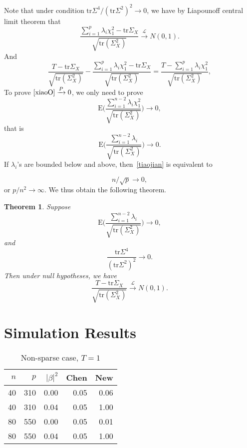 \documentclass[review]{elsarticle}
\theoremstyle{plain}
\newtheorem{theorem}{\quad\quad Theorem}
\theoremstyle{definition}
\theoremstyle{remark}
\begin{document}
Note that under condition \({\textrm{tr}\Sigma^4}/{{(\textrm{tr}\Sigma^2)}^2} \to 0\), we have by Liapounoff central limit theorem that
\[
    \frac{\sum_{i=1}^p \lambda_i \chi^2_1-\textrm{tr}\Sigma_X}{
        \sqrt{\textrm{tr}(\Sigma_X^2)}
    }\xrightarrow{\mathcal{L}}N(0,1).
    \]
And 
    \begin{equation}\label{xiaoO}
    \frac{T-\textrm{tr}\Sigma_X}{\sqrt{\textrm{tr}(\Sigma_X^2)}}-
    \frac{\sum_{i=1}^p \lambda_i \chi^2_1-\textrm{tr}\Sigma_X}{\sqrt{\textrm{tr}(\Sigma_X^2)}}
    =\frac{T-\sum_{i=1}^p \lambda_i \chi^2_1}{\sqrt{\textrm{tr}(\Sigma_X^2)}},
    \end{equation}
    To prove $\eqref{xiaoO}\xrightarrow{P}0$, we only need to prove
\[
    \textrm{E}\Big(\frac{\sum_{i=1}^{n-2} \lambda_i \chi^2_1}{
        \sqrt{\textrm{tr}(\Sigma_X^2)}}\Big)\to 0,
    \]
that is
    \begin{equation}\label{tiaojian}
    \textrm{E}\Big(\frac{\sum_{i=1}^{n-2} \lambda_i}{\sqrt{\textrm{tr}(\Sigma_X^2)}}\Big)\to 0.
    \end{equation}
If $\lambda_i$'s are bounded below and above, then~\eqref{tiaojian} is equivalent to

    \begin{equation}\label{npOrder}
        n/\sqrt{p}\to 0,
    \end{equation}
    or $p/n^2 \to \infty$. We thus obtain the following theorem.


\begin{theorem}
    Suppose
    \[
    \textrm{E}\Big(\frac{\sum_{i=1}^{n-2} \lambda_i}{\sqrt{\textrm{tr}(\Sigma_X^2)}}\Big)\to 0,
        \] 
    and
    \[
        \frac{\textrm{tr}\Sigma^4}{{(\textrm{tr}\Sigma^2)}^2} \to 0.
        \]
    Then under null hypotheses, we have
    \[
    \frac{T-\textrm{tr}\Sigma_X}{
        \sqrt{\textrm{tr}(\Sigma_X^2)}
    }\xrightarrow{\mathcal{L}}N(0,1).
        \]
\end{theorem}
\section{Simulation Results}
\begin{table}[ht]
    \centering
    \begin{tabular}{rrrrr}
          \hline
          $n$ & $p$ & $|\beta|^2$ & Chen & New \\ 
            \hline
        40 & 310 & 0.00 & 0.05 & 0.06 \\ 
          40 & 310 & 0.04 & 0.05 & 1.00 \\ 
            80 & 550 & 0.00 & 0.05 & 0.01 \\ 
              80 & 550 & 0.04 & 0.05 & 1.00 \\ 
                             \hline
    \end{tabular}
    \caption{Non-sparse case, $T=1$}
\end{table}
\end{document}
